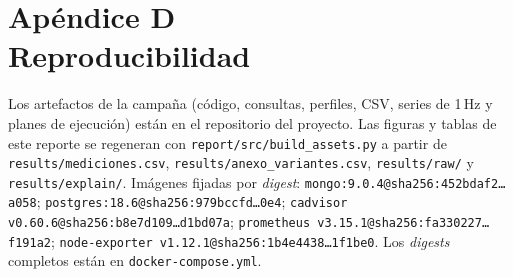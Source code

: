 \documentclass[12pt,letterpaper]{article}
\newcommand{\code}[1]{\texttt{#1}}
\begin{document}
\clearpage
\section{\texorpdfstring{Apéndice D\\Reproducibilidad}{Apéndice D. Reproducibilidad}}
\noindent Los artefactos de la campaña (código, consultas, perfiles, CSV, series de 1\,Hz y planes de ejecución) están en el repositorio del proyecto. Las figuras y tablas de este reporte se regeneran con
\code{report/src/build_assets.py} a partir de \code{results/mediciones.csv}, \code{results/anexo\_variantes.csv}, \code{results/raw/} y \code{results/explain/}.
Imágenes fijadas por \textit{digest}: \code{mongo:9.0.4@sha256:452bdaf2\ldots a058}; \code{postgres:18.6@sha256:979bccfd\ldots 0e4}; \code{cadvisor v0.60.6@sha256:b8e7d109\ldots d1bd07a};
\code{prometheus v3.15.1@sha256:fa330227\ldots f191a2}; \code{node-exporter v1.12.1@sha256:1b4e4438\ldots 1f1be0}. Los \textit{digests} completos están en \code{docker-compose.yml}.
\end{document}
